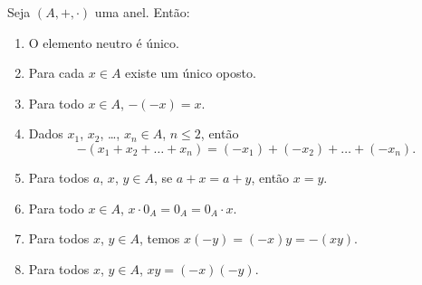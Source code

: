 \begin{proposicao}
	Seja $(A, + , \cdot)$ uma anel. Então:
	\begin{enumerate}[label={\roman*})]
		\item O elemento neutro {\'e} {\'u}nico.
		\item Para cada $x \in A$ existe um {\'u}nico oposto.
		\item Para todo $x \in A$, $-(-x) = x$.
		\item Dados $x_{1}$, $x_{2}$, \dots, $x_n \in A$, $n\leq 2$, ent{\~a}o
		\[
			-(x_1 + x_2 + \dots + x_n) = (-x_1) + (-x_2) + \dots + (-x_n).
		\]
		\item Para todos $a$, $x$, $y \in A$, se $a + x = a + y$, ent{\~a}o $x = y$.
		\item Para todo $x \in A$, $x\cdot 0_A = 0_A = 0_A\cdot x$.
		\item Para todos $x$, $y \in A$, temos $x(-y) = (-x)y = -(xy)$.
		\item Para todos $x$, $y \in A$, $xy = (-x)(-y)$.
	\end{enumerate}
\end{proposicao}
